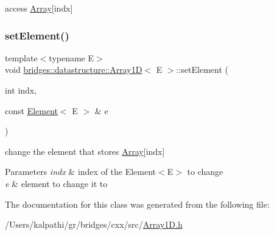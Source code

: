 access \mbox{\hyperlink{classbridges_1_1datastructure_1_1_array}{Array}}\mbox{[}indx\mbox{]} 

\mbox{\label{classbridges_1_1datastructure_1_1_array1_d_a1494c33b1f37bc4c9bc983f1f181488f}} 
\subsubsection{\texorpdfstring{setElement()}{setElement()}}
{\footnotesize\ttfamily template$<$typename E$>$ \\
void \mbox{\hyperlink{classbridges_1_1datastructure_1_1_array1_d}{bridges\+::datastructure\+::\+Array1D}}$<$ E $>$\+::set\+Element (\begin{DoxyParamCaption}\item[{int}]{indx,  }\item[{const \mbox{\hyperlink{classbridges_1_1datastructure_1_1_element}{Element}}$<$ E $>$ \&}]{e }\end{DoxyParamCaption})\hspace{0.3cm}{\ttfamily [inline]}}



change the element that stores \mbox{\hyperlink{classbridges_1_1datastructure_1_1_array}{Array}}\mbox{[}indx\mbox{]} 


\begin{DoxyParams}{Parameters}
{\em indx} & index of the Element$<$\+E$>$ to change \\
\hline
{\em e} & element to change it to \\
\hline
\end{DoxyParams}


The documentation for this class was generated from the following file\+:\begin{DoxyCompactItemize}
\item 
/\+Users/kalpathi/gr/bridges/cxx/src/\mbox{\hyperlink{_array1_d_8h}{Array1\+D.\+h}}\end{DoxyCompactItemize}
